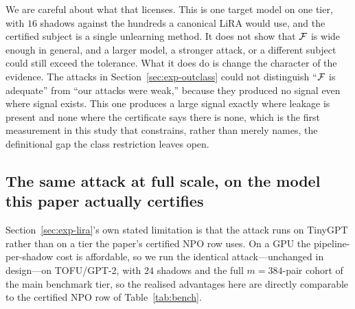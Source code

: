 We are careful about what that licenses. This is one target model on one tier, with
$16$ shadows against the hundreds a canonical LiRA would use, and the certified
subject is a single unlearning method. It does not show that $\F$ is wide enough in
general, and a larger model, a stronger attack, or a different subject could still
exceed the tolerance. What it does do is change the character of the evidence. The
attacks in Section~\ref{sec:exp-outclass} could not distinguish ``$\F$ is adequate''
from ``our attacks were weak,'' because they produced no signal even where signal
exists. This one produces a large signal exactly where leakage is present and none
where the certificate says there is none, which is the first measurement in this study
that constrains, rather than merely names, the definitional gap the class restriction
leaves open.

\begin{table}[t]
\centering\small
\caption{A LiRA-style shadow-model attack from outside $\F$ (TinyGPT tier, $16$
matched shadows, cohort $m = 256$, one target seed). ``declared $\F$'' is the
advantage the audit's own score class achieves on the same cohort; ``agreement'' is
the fraction of pairs on which LiRA and the declared class make the same guess.
Intervals are Clopper--Pearson on the sign rate: the betting confidence sequence
collapses onto the realised value once the cohort is exhausted
(Theorem~\ref{thm:cert}), so it carries no width here. The first row is the positive
control that makes the second interpretable.}
\label{tab:lira}

\end{table}

\subsection{The same attack at full scale, on the model this paper actually certifies}\label{sec:exp-lira-gpt2}

Section~\ref{sec:exp-lira}'s own stated limitation is that the attack runs on TinyGPT rather
than on a tier the paper's certified NPO row uses. On a GPU the pipeline-per-shadow
cost is affordable, so we run the identical attack---unchanged in design---on
TOFU/GPT-2, with $24$ shadows and the full $m=384$-pair cohort of the main benchmark
tier, so the realised advantages here are directly comparable to the certified NPO
row of Table~\ref{tab:bench}.

